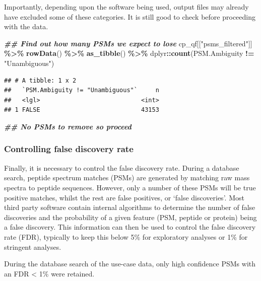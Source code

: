 \documentclass[9pt,a4paper,]{extarticle}
\newenvironment{Shaded}{\begin{snugshade}}{\end{snugshade}}
\newcommand{\DocumentationTok}[1]{\textcolor[rgb]{0.56,0.35,0.01}{\textbf{\textit{#1}}}}
\newcommand{\FunctionTok}[1]{\textcolor[rgb]{0.13,0.29,0.53}{\textbf{#1}}}
\newcommand{\NormalTok}[1]{#1}
\newcommand{\SpecialCharTok}[1]{\textcolor[rgb]{0.81,0.36,0.00}{\textbf{#1}}}
\newcommand{\StringTok}[1]{\textcolor[rgb]{0.31,0.60,0.02}{#1}}
\begin{document}
Importantly, depending upon the software being used, output files may already
have excluded some of these categories. It is still good to check before
proceeding with the data.

\begin{Shaded}
\begin{Highlighting}[]
\DocumentationTok{\#\# Find out how many PSMs we expect to lose}
\NormalTok{cp\_qf[[}\StringTok{"psms\_filtered"}\NormalTok{]] }\SpecialCharTok{\%\textgreater{}\%} 
  \FunctionTok{rowData}\NormalTok{() }\SpecialCharTok{\%\textgreater{}\%} 
  \FunctionTok{as\_tibble}\NormalTok{() }\SpecialCharTok{\%\textgreater{}\%} 
\NormalTok{  dplyr}\SpecialCharTok{::}\FunctionTok{count}\NormalTok{(PSM.Ambiguity }\SpecialCharTok{!=} \StringTok{"Unambiguous"}\NormalTok{)}
\end{Highlighting}
\end{Shaded}

\begin{verbatim}
## # A tibble: 1 x 2
##   `PSM.Ambiguity != "Unambiguous"`     n
##   <lgl>                            <int>
## 1 FALSE                            43153
\end{verbatim}

\begin{Shaded}
\begin{Highlighting}[]
\DocumentationTok{\#\# No PSMs to remove so proceed}
\end{Highlighting}
\end{Shaded}

\subsubsection{Controlling false discovery rate}\label{controlling-false-discovery-rate}

Finally, it is necessary to control the false discovery rate. During a database
search, peptide spectrum matches (PSMs) are generated by matching raw mass spectra
to peptide sequences. However, only a number of these PSMs will be true positive
matches, whilst the rest are false positives, or `false discoveries'. Most third
party software contain internal algorithms to determine the number of false
discoveries and the probability of a given feature (PSM, peptide or protein)
being a false discovery. This information can then be used to control the false
discovery rate (FDR), typically to keep this below 5\% for exploratory analyses or
1\% for stringent analyses.

During the database search of the use-case data, only high confidence PSMs with
an FDR \textless{} 1\% were retained.
\end{document}

